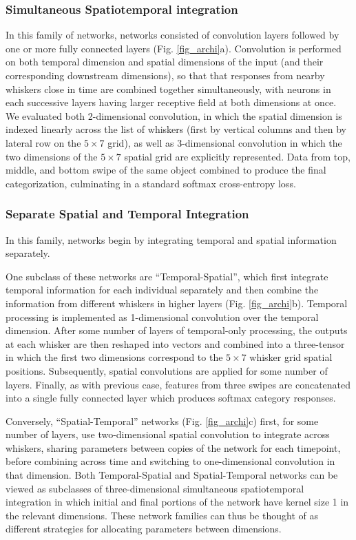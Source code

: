\subsubsection*{Simultaneous Spatiotemporal integration}

In this family of networks, networks consisted of convolution layers followed by one or more fully connected layers (Fig. \ref{fig_archi}a).  Convolution is performed on both temporal dimension and spatial dimensions of the input (and their corresponding downstream dimensions), so that that responses from nearby whiskers close in time are combined together simultaneously, with neurons in each successive layers having larger receptive field at both dimensions at once.
We evaluated both 2-dimensional convolution, in which the spatial dimension is indexed linearly across the list of whiskers (first by vertical columns and then by lateral row on the $5\times7$ grid), as well as 3-dimensional convolution in which the two dimensions of the $5\times7$ spatial grid are explicitly represented.
Data from top, middle, and bottom swipe of the same object combined to produce the final categorization, culminating in a standard softmax cross-entropy loss.  


\subsubsection*{Separate Spatial and Temporal Integration}

In this family, networks begin by integrating temporal and spatial information separately.  

One subclass of these networks are ``Temporal-Spatial'', which first integrate temporal information for each individual separately and then combine the information from different whiskers in higher layers (Fig. \ref{fig_archi}b).
Temporal processing is implemented as 1-dimensional convolution over the temporal dimension. 
After some number of layers of temporal-only processing, the outputs at each whisker are then reshaped into vectors and combined into a three-tensor in which the first two dimensions correspond to the $5\times7$ whisker grid spatial positions.  Subsequently, spatial convolutions are applied for some number of layers. 
Finally, as with previous case, features from three swipes  are concatenated into a single fully connected layer which produces softmax category responses.

Conversely, ``Spatial-Temporal'' networks (Fig. \ref{fig_archi}c) first, for some number of layers, use two-dimensional spatial convolution to integrate across whiskers, sharing parameters between copies of the network for each timepoint, before combining across time and switching to one-dimensional convolution in that dimension.  
Both Temporal-Spatial and Spatial-Temporal networks can be viewed as subclasses of three-dimensional simultaneous spatiotemporal integration in which initial and final portions of the network have kernel size 1 in the relevant dimensions.  
These network families can thus be thought of as different strategies for allocating parameters between dimensions. 


